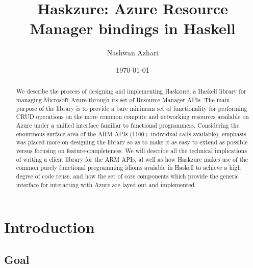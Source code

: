 \documentclass[11pt]{report}
\begin{document}
\date{\today{}}
\title{Haskzure: Azure Resource Manager bindings in Haskell}
\author{Nashwan Azhari}

\maketitle{}

\begin{abstract}

We describe the process of designing and implementing Haskzure, a Haskell
library for managing Microsoft Azure through its set of Resource Manager APIs. The
main purpose of the library is to provide a bare minimum set of functionality
for performing CRUD operations on the more common compute and networking
resources available on Azure under a unified interface familiar to functional
programmers.
Considering the enourmous surface area of the ARM APIs (1100+ individual calls
available), emphasis was placed more on designing the library so as to make it
as easy to extend as possible versus focusing on feature-completeness. \newline
We will describe all the technical implications of writing a client library for
the ARM APIs, al well as  how Haskzure makes use of the common purely
functional programming idioms avaiable in Haskell to achieve a high degree of
code reuse, and how the set of core components which provide the generic
interface for interacting with Azure are layed out and implemented.

\end{abstract}

\tableofcontents{}

\renewcommand\listoflistingscaption{List of source codes}
\listoflistings

\chapter{Introduction}

\section{Goal}
\end{document}
